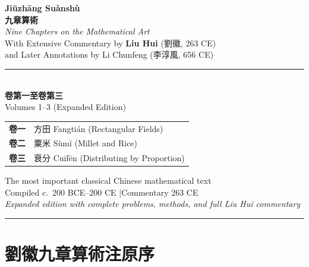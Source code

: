 \documentclass[11pt,a4paper]{article}
\begin{document}
\begin{titlepage}
\begin{center}
\vspace*{2.5cm}

{\Huge\bfseries\color{titlecolor} Ji\u{u}zh\={a}ng Su\`{a}nsh\`{u}}\\[0.6cm]
{\LARGE\bfseries\color{sectioncolor} 九章算術}\\[1.2cm]
{\Large\textit{Nine Chapters on the Mathematical Art}}\\[1.8cm]
{\large With Extensive Commentary by \textbf{Liu Hui} (劉徽, 263 CE)}\\[0.4cm]
{\large and Later Annotations by Li Chunfeng (李淳風, 656 CE)}\\[2.5cm]

\rule{0.6\textwidth}{0.8pt}\\[1.2cm]

{\Large\bfseries 卷第一至卷第三}\\[0.8cm]
{\large Volumes 1--3 (Expanded Edition)}\\[1.5cm]

\begin{tabular}{cl}
\textbf{卷一} & 方田 \quad Fangti\'{a}n \quad (Rectangular Fields)\\
\textbf{卷二} & 粟米 \quad S\`{u}m\u{i} \quad (Millet and Rice)\\
\textbf{卷三} & 衰分 \quad Cu\={i}f\={e}n \quad (Distributing by Proportion)\\
\end{tabular}

\vfill

{\small The most important classical Chinese mathematical text}\\[0.3cm]
{\small Compiled c.~200 BCE--200 CE \quad|\quad Commentary 263 CE}\\[0.5cm]
{\small\textit{Expanded edition with complete problems, methods, and full Liu Hui commentary}}\\[1cm]

\rule{0.4\textwidth}{0.4pt}

\end{center}
\end{titlepage}

\tableofcontents
\newpage


\section*{劉徽九章算術注原序}
\end{document}
